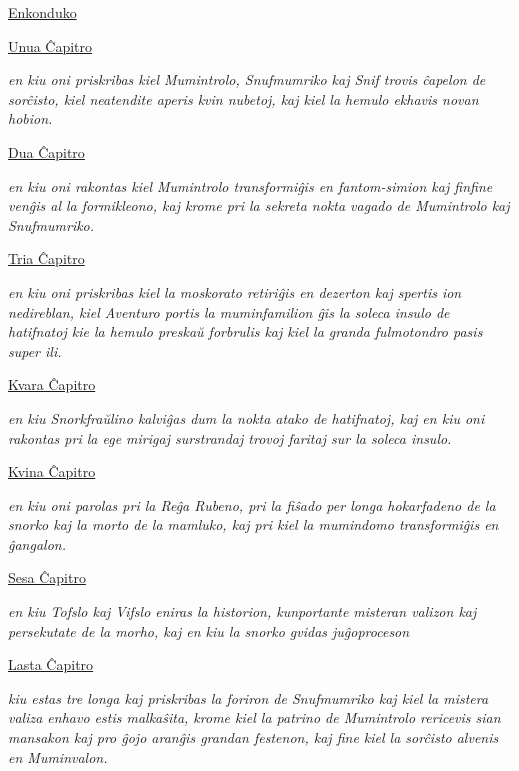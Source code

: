 \begin{small}
\hyperref[Enkonduko]{Enkonduko}\hfill\pageref{Enkonduko}

\hyperref[Unua Ĉapitro]{Unua Ĉapitro}\hfill\pageref{Unua Ĉapitro}

\noindent\textit{en kiu oni priskribas kiel Mumintrolo, Snufmumriko kaj Snif trovis ĉapelon de sorĉisto, kiel neatendite aperis kvin nubetoj, kaj kiel la hemulo ekhavis novan hobion.}

\hyperref[Dua Ĉapitro]{Dua Ĉapitro}\hfill\pageref{Dua Ĉapitro}

\noindent\textit{en kiu oni rakontas kiel Mumintrolo transformiĝis en fantom-simion kaj finfine venĝis al la formikleono, kaj krome pri la sekreta nokta vagado de Mumintrolo kaj Snufmumriko.}

\hyperref[Tria Ĉapitro]{Tria Ĉapitro}\hfill\pageref{Tria Ĉapitro}

\noindent\textit{en kiu oni priskribas kiel la moskorato retiriĝis en dezerton kaj spertis ion nedireblan, kiel Aventuro portis la muminfamilion ĝis la soleca insulo de hatifnatoj kie la hemulo preskaŭ forbrulis kaj kiel la granda fulmotondro pasis super ili.}

\hyperref[Kvara Ĉapitro]{Kvara Ĉapitro}\hfill\pageref{Kvara Ĉapitro}

\noindent\textit{en kiu Snorkfraŭlino kalviĝas dum la nokta atako de hatifnatoj, kaj en kiu oni rakontas pri la ege mirigaj surstrandaj trovoj faritaj sur la soleca insulo.}

\hyperref[Kvina Ĉapitro]{Kvina Ĉapitro}\hfill\pageref{Kvina Ĉapitro}

\noindent\textit{en kiu oni parolas pri la Reĝa Rubeno, pri la fiŝado per longa hokarfadeno de la snorko kaj la morto de la mamluko, kaj pri kiel la mumindomo transformiĝis en ĝangalon.}

\hyperref[Sesa Ĉapitro]{Sesa Ĉapitro}\hfill\pageref{Sesa Ĉapitro}

\noindent\textit{en kiu Tofslo kaj Vifslo eniras la historion, kunportante misteran valizon kaj persekutate de la morho, kaj en kiu la snorko gvidas juĝoproceson}

\hyperref[Lasta Ĉapitro]{Lasta Ĉapitro}\hfill\pageref{Lasta Ĉapitro}

\noindent\textit{kiu estas tre longa kaj priskribas la foriron de Snufmumriko kaj kiel la mistera valiza enhavo estis malkaŝita, krome kiel la patrino de Mumintrolo rericevis sian mansakon kaj pro ĝojo aranĝis grandan festenon, kaj fine kiel la sorĉisto alvenis en Muminvalon.}

\end{small}

